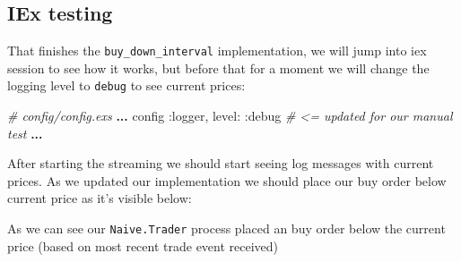 \documentclass[
  oneside]{book}
\newenvironment{Shaded}{\begin{snugshade}}{\end{snugshade}}
\newcommand{\AttributeTok}[1]{\textcolor[rgb]{0.77,0.63,0.00}{#1}}
\newcommand{\CommentTok}[1]{\textcolor[rgb]{0.56,0.35,0.01}{\textit{#1}}}
\newcommand{\ErrorTok}[1]{\textcolor[rgb]{0.64,0.00,0.00}{\textbf{#1}}}
\newcommand{\ExtensionTok}[1]{#1}
\newcommand{\KeywordTok}[1]{\textcolor[rgb]{0.13,0.29,0.53}{\textbf{#1}}}
\newcommand{\NormalTok}[1]{#1}
\newcommand{\OperatorTok}[1]{\textcolor[rgb]{0.81,0.36,0.00}{\textbf{#1}}}
\newcommand{\StringTok}[1]{\textcolor[rgb]{0.31,0.60,0.02}{#1}}
\newcommand{\VariableTok}[1]{\textcolor[rgb]{0.00,0.00,0.00}{#1}}
\begin{document}
\hypertarget{iex-testing-1}{%
\subsection{IEx testing}\label{iex-testing-1}}

That finishes the \texttt{buy\_down\_interval} implementation, we will jump into iex session to see how it works, but before that for a moment we will change the logging level to \texttt{debug} to see current prices:

\begin{Shaded}
\begin{Highlighting}[]
\CommentTok{\# config/config.exs}
\OperatorTok{...}
\NormalTok{config }\VariableTok{:logger}\NormalTok{,}
  \VariableTok{level:} \VariableTok{:debug} \CommentTok{\# \textless{}= updated for our manual test}
\OperatorTok{...}
\end{Highlighting}
\end{Shaded}

After starting the streaming we should start seeing log messages with current prices. As we updated our implementation we should place our buy order below current price as it's visible below:

\begin{Shaded}
\end{Shaded}

As we can see our \texttt{Naive.Trader} process placed an buy order below the current price (based on most recent trade event received)
\end{document}
